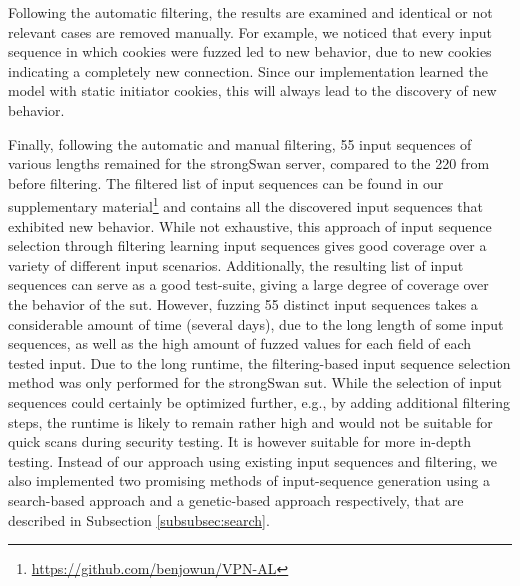 Following the automatic filtering, the results are examined and identical or not relevant cases are removed manually. For example, we noticed that every input sequence in which cookies were fuzzed led to new behavior, due to new cookies indicating a completely new connection. Since our implementation learned the model with static initiator cookies, this will always lead to the discovery of new behavior. 

\newpage
Finally, following the automatic and manual filtering, 55 input sequences of various lengths remained for the strongSwan server, compared to the 220 from before filtering. The filtered list of input sequences can be found in our supplementary material\footnote{\url{https://github.com/benjowun/VPN-AL}} and contains all the discovered input sequences that exhibited new behavior. While not exhaustive, this approach of input sequence selection through filtering learning input sequences gives good coverage over a variety of different input scenarios. Additionally, the resulting list of input sequences can serve as a good test-suite, giving a large degree of coverage over the behavior of the \ac{sut}. However, fuzzing 55 distinct input sequences takes a considerable amount of time (several days), due to the long length of some input sequences, as well as the high amount of fuzzed values for each field of each tested input. Due to the long runtime, the filtering-based input sequence selection method was only performed for the strongSwan \ac{sut}. While the selection of input sequences could certainly be optimized further, e.g., by adding additional filtering steps, the runtime is likely to remain rather high and would not be suitable for quick scans during security testing. It is however suitable for more in-depth testing. Instead of our approach using existing input sequences and filtering, we also implemented two promising methods of input-sequence generation using a search-based approach and a genetic-based approach respectively, that are described in Subsection \ref{subsubsec:search}.

